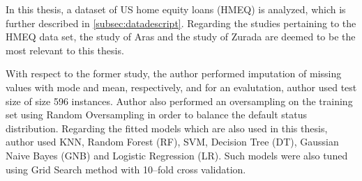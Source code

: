 In this thesis, a dataset of US home equity loans (HMEQ) is analyzed, which is further described in \autoref{subsec:datadescript}.
Regarding the studies pertaining to the HMEQ data set, the study of Aras \citep{serkan2021bagging} and the study of Zurada \citep{zurada2014classification} are deemed to be the most relevant to this thesis.


With respect to the former study, the author performed imputation of missing values with mode and mean, respectively, and for an evalutation, author used test size of size 596 instances.
Author also performed an oversampling on the training set using Random Oversampling in order to balance the default status distribution.
Regarding the fitted models which are also used in this thesis, author used KNN, Random Forest (RF), SVM, Decision Tree (DT), Gaussian Naive Bayes (GNB) and Logistic Regression (LR).
Such models were also tuned using Grid Search method with 10--fold cross validation.

